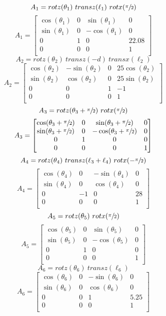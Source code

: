 \[
A_1 = rotz(\theta_1) ~ transz(\ell_1) ~ rotx(\sfrac{\pi}{2})
\]
\vspace{.25ex}
\[
A_1 =
\begin{bmatrix}
  \cos(\theta_1) & 0 & \sin(\theta_1) & 0 \\
  \sin(\theta_1) & 0 & -\cos(\theta_1) & 0 \\
  0 & 1 & 0 & 22.08 \\
  0 & 0 & 0 & 1 \\
\end{bmatrix}
\]
\vspace{.25ex}
\[
A_2 = rotz(\theta_2) ~ transz(-d) ~ transx(\ell_2)
\]
\vspace{.25ex}
\[
A_2 =
\begin{bmatrix}
  \cos(\theta_2) & -\sin(\theta_2) & 0 & 25\cos(\theta_2) \\
  \sin(\theta_2) & \cos(\theta_2) & 0 & 25\sin(\theta_2) \\
  0 & 0 & 1 & -1 \\
  0 & 0 & 0 & 1 \\
\end{bmatrix}
\]
\vspace{.25ex}
\[
A_3 = rotz(\theta_3 + \sfrac{\pi}{2}) ~ rotx(\sfrac{\pi}{2})
\]
\vspace{.25ex}
\[
A_3 =
\begin{bmatrix}
  \cos(\theta_3 +  \sfrac{\pi}{2}) & 0 & \sin(\theta_3 +  \sfrac{\pi}{2}) & 0 \\
  \sin(\theta_3 +  \sfrac{\pi}{2}) & 0 & -\cos(\theta_3 +  \sfrac{\pi}{2}) & 0 \\
  0 & 1 & 0 & 0 \\
  0 & 0 & 0 & 1 \\
\end{bmatrix}
\]
\vspace{.25ex}
\[
A_4 = rotz(\theta_4) ~ transz(\ell_3 + \ell_4) ~ rotx(-\sfrac{\pi}{2})
\]
\vspace{.25ex}
\[
A_4 =
\begin{bmatrix}
  \cos(\theta_4) & 0 & -\sin(\theta_4) & 0 \\
  \sin(\theta_4) & 0 & \cos(\theta_4) & 0 \\
  0 & -1 & 0 & 28 \\
  0 & 0 & 0 & 1 \\
\end{bmatrix}
\]
\vspace{.25ex}
\[
A_5 = rotz(\theta_5) ~ rotx(\sfrac{\pi}{2})
\]
\vspace{.25ex}
\[
A_5 =
\begin{bmatrix}
  \cos(\theta_5) & 0 & \sin(\theta_5) & 0 \\
  \sin(\theta_5) & 0 & -\cos(\theta_5) & 0 \\
  0 & 1 & 0 & 0 \\
  0 & 0 & 0 & 1 \\
\end{bmatrix}
\]
\vspace{.25ex}
\[
A_6 = rotz(\theta_6) ~ transz(\ell_6)
\]
\vspace{.5ex}
\[
A_6 =
\begin{bmatrix}
  \cos(\theta_6) & 0 & -\sin(\theta_6) & 0 \\
  \sin(\theta_6) & 0 & \cos(\theta_6) & 0 \\
  0 & 0 & 1 & 5.25 \\
  0 & 0 & 0 & 1 \\
\end{bmatrix}
\]
